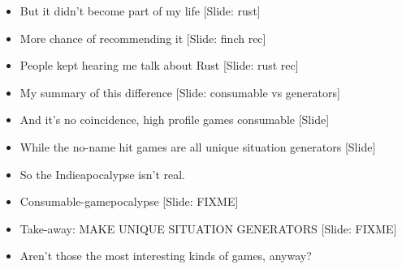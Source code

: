 \documentclass[12pt]{article}
\begin{document}
{\begin{itemize}
\item But it didn't become part of my life [Slide: rust]

\item More chance of recommending it [Slide:  finch rec]

\item People kept hearing me talk about Rust [Slide:  rust rec]

\item My summary of this difference [Slide: consumable vs generators]

\item And it's no coincidence, high profile games consumable [Slide]

\item While the no-name hit games are all unique situation generators [Slide]

\item So the Indieapocalypse isn't real.

\item Consumable-gamepocalypse [Slide:  FIXME]

\item Take-away:  MAKE UNIQUE SITUATION GENERATORS [Slide: FIXME]

\item Aren't those the most interesting kinds of games, anyway?

\end{itemize}

}
\end{document}
